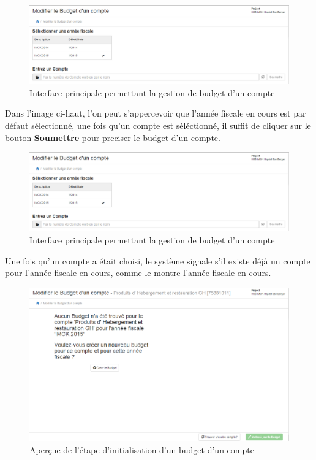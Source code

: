 \documentclass[12pt,a4paper]{report}
\begin{document}
\begin{figure}[h]
\begin{center}
\includegraphics[width=12cm]{pic/ModifierBudgCompte.png}
\end{center}
\caption{Interface principale permettant la gestion de budget d'un compte}
\label{Interface principale permettant la gestion de budget d'un compte}
\end{figure}

Dans l'image ci-haut, l'on peut s'appercevoir que l'année fiscale en cours est par défaut sélectionné, une fois qu'un compte est séléctionné, il suffit de cliquer sur le bouton \textbf{Soumettre} pour preciser le budget d'un compte. 

\begin{figure}[h]
\begin{center}
\includegraphics[width=12cm]{pic/ModifierBudgCompte.png}
\end{center}
\caption{Interface principale permettant la gestion de budget d'un compte}
\label{Interface principale permettant la gestion de budget d'un compte}
\end{figure}

Une fois qu'un compte a était choisi, le système signale s'il existe déjà un compte pour l'année fiscale en cours, comme le montre l'année fiscale en cours. 

\begin{figure}[h]
\begin{center}
\includegraphics[width=12cm]{pic/ModBudger1.png}
\end{center}
\caption{Aperçue de l'étape d'initialisation d'un budget d'un compte}
\label{Aperçue de l'étape d'initialisation d'un budget d'un compte}
\end{figure}
\end{document}
